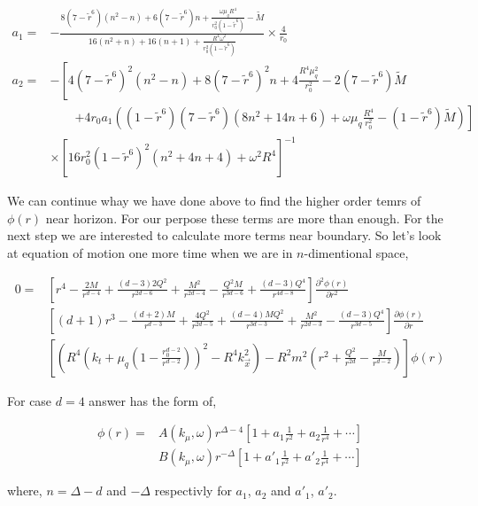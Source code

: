 \begin{align}
    a_1 =& -\frac{8(7-\tilde{r}^6)(n^2-n)+6(7-\tilde{r}^6)n+\frac{\omega\mu_qR^4}{r_0^2(1-\tilde{r}^6)}-\tilde{M}}{16(n^2+n)+16(n+1)+\frac{R^4\omega^2}{r_0^2(1-\tilde{r}^6)}} \times \frac{4}{r_0} \nonumber\\    
    a_2 =& -\left[4(7-\tilde{r}^6)^2(n^2-n) + 8(7-\tilde{r}^6)^2n + 4\frac{R^4\mu_q^2}{r_0^2} - 2(7-\tilde{r}^6)\tilde{M} \right.\nonumber\\
         & \qquad \left. + 4r_0a_1\left((1-\tilde{r}^6)(7-\tilde{r}^6)(8n^2+14n+6) + \omega\mu_q\frac{R^4}{r_0^2} - (1-\tilde{r}^6)\tilde{M} \right) \right] \nonumber\\
         & \times \left[ 16r_0^2(1-\tilde{r}^6)^2(n^2 + 4n + 4) + \omega^2R^4 \right]^{-1} 
\end{align}

We can continue whay we have done above to find the higher order temrs of $\phi(r)$ near horizon. For our perpose these terms are more than enough. For the next step we are interested to calculate more terms near boundary. So let's look at equation of motion one more time when we are in $n$-dimentional space,

\begin{align}
    0 =& \left[r^4 - \frac{2M}{r^{d-4}} + \frac{(d-3)2Q^2}{r^{2d-6}} + \frac{M^2}{r^{2d-4}} - \frac{Q^2M}{r^{3d-6}} + \frac{(d-3)Q^4}{r^{4d-8}}\right] \frac{\partial^2\phi(r)}{\partial r^2} \nonumber\\
       & \left[(d+1)r^3 - \frac{(d+2)M}{r^{d-3}} + \frac{4Q^2}{r^{2d-5}} + \frac{(d-4)MQ^2}{r^{3d-3}} + \frac{M^2}{r^{2d-3}} - \frac{(d-3)Q^4}{r^{3d-5}} \right] \frac{\partial\phi(r)}{\partial r} \nonumber\\
       & \left[\left(R^4 \left(k_t +\mu_q(1-\frac{r_0^{d-2}}{r^{d-2}})\right)^2 - R^4k_{\vec{x}}^2\right)-R^2m^2\left(r^2 + \frac{Q^2}{r^{2d}} - \frac{M}{r^{d-2}}\right)\right] \phi(r)
\end{align}

For case $d =4$ answer has the form of, 

\begin{align}
    \phi(r) =& A(k_\mu,\omega)r^{\Delta-4}\left[1 + a_1\frac{1}{r^2} + a_2\frac{1}{r^4} + \cdots\right]\nonumber\\
             & B(k_\mu,\omega)r^{-\Delta} \left[1 + a'_1\frac{1}{r^2}+ a'_2\frac{1}{r^4}+ \cdots\right]
\end{align}

where, $n =\Delta-d$ and $-\Delta$ respectivly for $a_1$, $a_2$ and $a'_1$, $a'_2$.

